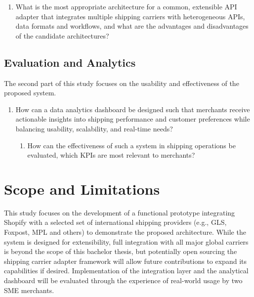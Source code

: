 \documentclass{imc-inf}
\begin{document}
\begin{enumerate}[label=\textbf{MRQ\arabic*}, left=0pt, itemsep=3pt]
  \item What is the most appropriate architecture for a common, extensible API adapter that integrates multiple shipping carriers with heterogeneous APIs, data formats and workflows, and what are the advantages and disadvantages of the candidate architectures?
\end{enumerate}

\subsection{Evaluation and Analytics}
The second part of this study focuses on the usability and effectiveness of the proposed system.

\begin{enumerate}[resume, label=\textbf{MRQ\arabic*}, left=0pt, itemsep=3pt]
  \item How can a data analytics dashboard be designed such that merchants receive actionable insights into shipping performance and customer preferences while balancing usability, scalability, and real-time needs?
        \begin{enumerate}[label=\textbf{SRQ\arabic{enumi}.\arabic*}, left=1.8em, itemsep=3pt]
          \item How can the effectiveness of such a system in shipping operations be evaluated, which KPIs are most relevant to merchants?
        \end{enumerate}
\end{enumerate}

\section{Scope and Limitations}
This study focuses on the development of a functional prototype integrating Shopify with a selected set of international shipping providers (e.g., GLS, Foxpost, MPL and others) to demonstrate the proposed architecture.
While the system is designed for extensibility, full integration with all major global carriers is beyond the scope of this bachelor thesis, but potentially open sourcing the shipping carrier adapter framework will allow future contributions to expand its capabilities if desired.
Implementation of the integration layer and the analytical dashboard will be evaluated through the experience of real-world usage by two SME merchants.
\end{document}

